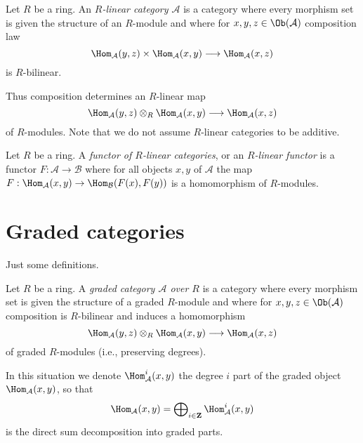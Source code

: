 \begin{definition}
\label{definition-linear-category}
Let $R$ be a ring. An {\it $R$-linear category $\mathcal{A}$} is a category
where every morphism set is given the structure of an $R$-module
and where for $x, y, z \in \Ob(\mathcal{A})$ composition law
$$
\Hom_\mathcal{A}(y, z) \times \Hom_\mathcal{A}(x, y)
\longrightarrow
\Hom_\mathcal{A}(x, z)
$$
is $R$-bilinear.
\end{definition}

\noindent
Thus composition determines an $R$-linear map
$$
\Hom_\mathcal{A}(y, z) \otimes_R \Hom_\mathcal{A}(x, y)
\longrightarrow
\Hom_\mathcal{A}(x, z)
$$
of $R$-modules. Note that we do not assume $R$-linear categories to be
additive.

\begin{definition}
\label{definition-functor-linear-categories}
Let $R$ be a ring. A {\it functor of $R$-linear categories}, or an
{\it $R$-linear functor} is a functor $F : \mathcal{A} \to \mathcal{B}$
where for all objects $x, y$ of $\mathcal{A}$ the map
$F : \Hom_\mathcal{A}(x, y) \to \Hom_\mathcal{B}(F(x), F(y))$
is a homomorphism of $R$-modules.
\end{definition}







\section{Graded categories}
\label{section-graded}

\noindent
Just some definitions.

\begin{definition}
\label{definition-graded-category}
Let $R$ be a ring. A {\it graded category $\mathcal{A}$
over $R$} is a category where every morphism set is given the structure
of a graded $R$-module and where for
$x, y, z \in \Ob(\mathcal{A})$ composition is $R$-bilinear and induces
a homomorphism
$$
\Hom_\mathcal{A}(y, z) \otimes_R \Hom_\mathcal{A}(x, y)
\longrightarrow
\Hom_\mathcal{A}(x, z)
$$
of graded $R$-modules (i.e., preserving degrees).
\end{definition}

\noindent
In this situation we denote $\Hom_\mathcal{A}^i(x, y)$ the degree $i$
part of the graded object $\Hom_\mathcal{A}(x, y)$, so that
$$
\Hom_\mathcal{A}(x, y) =
\bigoplus\nolimits_{i \in \mathbf{Z}} \Hom_\mathcal{A}^i(x, y)
$$
is the direct sum decomposition into graded parts.

